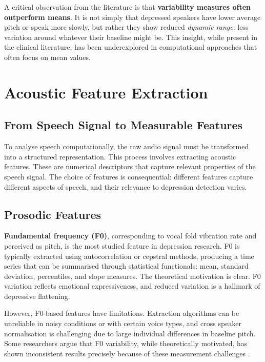 A critical observation from the literature is that \textbf{variability measures often outperform means}. It is not simply that depressed speakers have lower average pitch or speak more slowly, but rather they show reduced \textit{dynamic range}: less variation around whatever their baseline might be. This insight, while present in the clinical literature, has been underexplored in computational approaches that often focus on mean values.

\section{Acoustic Feature Extraction}

\subsection{From Speech Signal to Measurable Features}

To analyse speech computationally, the raw audio signal must be transformed into a structured representation. This process involves extracting acoustic features. These are numerical descriptors that capture relevant properties of the speech signal. The choice of features is consequential: different features capture different aspects of speech, and their relevance to depression detection varies.

\subsection{Prosodic Features}

\textbf{Fundamental frequency (F0)}, corresponding to vocal fold vibration rate and perceived as pitch, is the most studied feature in depression research. F0 is typically extracted using autocorrelation or cepstral methods, producing a time series that can be summarised through statistical functionals: mean, standard deviation, percentiles, and slope measures. The theoretical motivation is clear. F0 variation reflects emotional expressiveness, and reduced variation is a hallmark of depressive flattening.

However, F0-based features have limitations. Extraction algorithms can be unreliable in noisy conditions or with certain voice types, and cross speaker normalisation is challenging due to large individual differences in baseline pitch. Some researchers argue that F0 variability, while theoretically motivated, has shown inconsistent results precisely because of these measurement challenges \cite{Cummins2015}.

